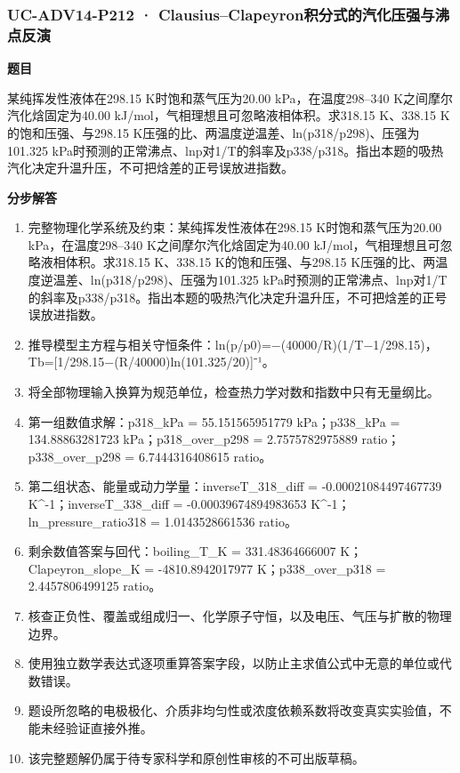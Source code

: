 \documentclass[UTF8,11pt,a4paper]{ctexart}
\begin{document}
\subsubsection*{UC-ADV14-P212 · Clausius–Clapeyron积分式的汽化压强与沸点反演}
\noindent\textbf{题目}\par
某纯挥发性液体在298.15 K时饱和蒸气压为20.00 kPa，在温度298–340 K之间摩尔汽化焓固定为40.00 kJ/mol，气相理想且可忽略液相体积。求318.15 K、338.15 K的饱和压强、与298.15 K压强的比、两温度逆温差、ln(p318/p298)、压强为101.325 kPa时预测的正常沸点、lnp对1/T的斜率及p338/p318。指出本题的吸热汽化决定升温升压，不可把焓差的正号误放进指数。\par
\medskip\noindent\textbf{分步解答}
\begin{enumerate}
\item 完整物理化学系统及约束：某纯挥发性液体在298.15 K时饱和蒸气压为20.00 kPa，在温度298–340 K之间摩尔汽化焓固定为40.00 kJ/mol，气相理想且可忽略液相体积。求318.15 K、338.15 K的饱和压强、与298.15 K压强的比、两温度逆温差、ln(p318/p298)、压强为101.325 kPa时预测的正常沸点、lnp对1/T的斜率及p338/p318。指出本题的吸热汽化决定升温升压，不可把焓差的正号误放进指数。
\item 推导模型主方程与相关守恒条件：ln(p/p0)=−(40000/R)(1/T−1/298.15)，Tb=[1/298.15−(R/40000)ln(101.325/20)]⁻¹。
\item 将全部物理输入换算为规范单位，检查热力学对数和指数中只有无量纲比。
\item 第一组数值求解：p318\_kPa = 55.151565951779 kPa；p338\_kPa = 134.88863281723 kPa；p318\_over\_p298 = 2.7575782975889 ratio；p338\_over\_p298 = 6.7444316408615 ratio。
\item 第二组状态、能量或动力学量：inverseT\_318\_diff = -0.00021084497467739 K\textasciicircum{}-1；inverseT\_338\_diff = -0.00039674894983653 K\textasciicircum{}-1；ln\_pressure\_ratio318 = 1.0143528661536 ratio。
\item 剩余数值答案与回代：boiling\_T\_K = 331.48364666007 K；Clapeyron\_slope\_K = -4810.8942017977 K；p338\_over\_p318 = 2.4457806499125 ratio。
\item 核查正负性、覆盖或组成归一、化学原子守恒，以及电压、气压与扩散的物理边界。
\item 使用独立数学表达式逐项重算答案字段，以防止主求值公式中无意的单位或代数错误。
\item 题设所忽略的电极极化、介质非均匀性或浓度依赖系数将改变真实实验值，不能未经验证直接外推。
\item 该完整题解仍属于待专家科学和原创性审核的不可出版草稿。
\end{enumerate}
\end{document}
